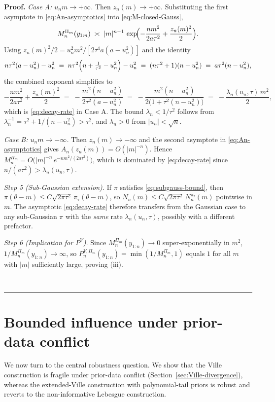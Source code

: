 \documentclass{article}%
\newenvironment{proof}[1][Proof]{\noindent\textbf{#1.} }{\ \rule{0.5em}{0.5em}}
\newcommand{\1}{\mathbf{1}}
\begin{document}
\begin{proof}
\emph{Case A: $u_{n}m\to+\infty$.} Then $z_{n}(m)\to+\infty$. Substituting the first asymptote in \eqref{eq:An-asymptotics} into \eqref{eq:M-closed-Gauss},
\[
   M_{n}^{\Pi_{m}}(y_{1:n})\;\asymp\;|m|^{n-1}\,\exp\!\Bigl(-\frac{nm^{2}}{2a\tau^{2}}+\frac{z_{n}(m)^{2}}{2}\Bigr).
\]
Using $z_{n}(m)^{2}/2=u_{n}^{2}m^{2}/[2\tau^{4}a(a-u_{n}^{2})]$ and the identity
\[
   n\tau^{2}(a-u_{n}^{2})-u_{n}^{2}
   \;=\; n\tau^{2}\Bigl(n+\tfrac{1}{\tau^{2}}-u_{n}^{2}\Bigr)-u_{n}^{2}
   \;=\; (n\tau^{2}+1)(n-u_{n}^{2})
   \;=\; a\tau^{2}(n-u_{n}^{2}),
\]
the combined exponent simplifies to
\[
   -\frac{nm^{2}}{2a\tau^{2}}+\frac{z_{n}(m)^{2}}{2}
   \;=\; -\frac{m^{2}(n-u_{n}^{2})}{2\tau^{2}(a-u_{n}^{2})}
   \;=\; -\frac{m^{2}(n-u_{n}^{2})}{2\bigl(1+\tau^{2}(n-u_{n}^{2})\bigr)}
   \;=\; -\frac{\lambda_{n}(u_{n},\tau)\,m^{2}}{2},
\]
which is \eqref{eq:decay-rate} in Case A. The bound $\lambda_{n}<1/\tau^{2}$ follows from $\lambda_{n}^{-1}=\tau^{2}+1/(n-u_{n}^{2})>\tau^{2}$, and $\lambda_{n}>0$ from $|u_{n}|<\sqrt n$.

\emph{Case B: $u_{n}m\to-\infty$.} Then $z_{n}(m)\to-\infty$ and the second asymptote in \eqref{eq:An-asymptotics} gives $A_{n}(z_{n}(m))=O(|m|^{-n})$. Hence $M_{n}^{\Pi_{m}}=O\bigl(|m|^{-n}\,e^{-nm^{2}/(2a\tau^{2})}\bigr)$, which is dominated by \eqref{eq:decay-rate} since $n/(a\tau^{2})>\lambda_{n}(u_{n},\tau)$.
 
\emph{Step 5 (Sub-Gaussian extension).} If $\pi$ satisfies \eqref{eq:subgauss-bound}, then $\pi(\theta-m)\le C\sqrt{2\pi\tau^{2}}\,\pi_{\tau}(\theta-m)$, so $N_{n}(m)\le C\sqrt{2\pi\tau^{2}}\,N_{n}^{\pi_{\tau}}(m)$ pointwise in $m$. The asymptotic \eqref{eq:decay-rate} therefore transfers from the Gaussian case to any sub-Gaussian $\pi$ with the \emph{same} rate $\lambda_{n}(u_{n},\tau)$, possibly with a different prefactor.
 
\emph{Step 6 (Implication for $P^{V}$).} Since $M_{n}^{\Pi_{m}}(y_{1:n})\to 0$ super-exponentially in $m^{2}$, $1/M_{n}^{\Pi_{m}}(y_{1:n})\to\infty$, so $P_{n}^{V,\Pi_{m}}(y_{1:n})=\min(1/M_{n}^{\Pi_{m}},1)$ equals $1$ for all $m$ with $|m|$ sufficiently large, proving (iii).

\end{proof}



\section{Bounded influence under prior-data conflict}\label{sec:bdd-influence}
We now turn to the central robustness question. We show that the Ville construction is fragile under prior-data conflict (Section~\ref{sec:Ville-divergence}), whereas the extended-Ville
construction with polynomial-tail priors is robust and reverts to the non-informative Lebesgue construction.
\end{document}
